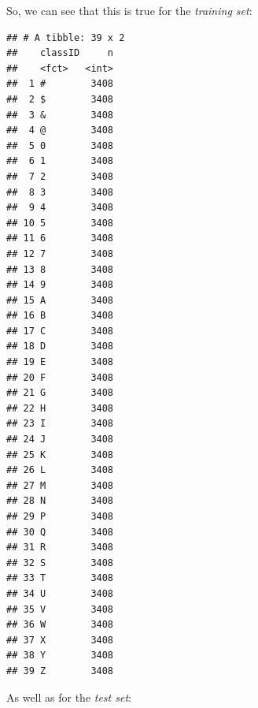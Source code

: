 \documentclass[
]{report}
\newenvironment{Shaded}{\begin{snugshade}}{\end{snugshade}}
\newcommand{\AttributeTok}[1]{\textcolor[rgb]{0.13,0.29,0.53}{#1}}
\newcommand{\FunctionTok}[1]{\textcolor[rgb]{0.13,0.29,0.53}{\textbf{#1}}}
\newcommand{\NormalTok}[1]{#1}
\newcommand{\SpecialCharTok}[1]{\textcolor[rgb]{0.81,0.36,0.00}{\textbf{#1}}}
\begin{document}
\newpage

So, we can see that this is true for the \emph{training set}:

\begin{Shaded}
\end{Shaded}

\footnotesize

\begin{verbatim}
## # A tibble: 39 x 2
##    classID     n
##    <fct>   <int>
##  1 #        3408
##  2 $        3408
##  3 &        3408
##  4 @        3408
##  5 0        3408
##  6 1        3408
##  7 2        3408
##  8 3        3408
##  9 4        3408
## 10 5        3408
## 11 6        3408
## 12 7        3408
## 13 8        3408
## 14 9        3408
## 15 A        3408
## 16 B        3408
## 17 C        3408
## 18 D        3408
## 19 E        3408
## 20 F        3408
## 21 G        3408
## 22 H        3408
## 23 I        3408
## 24 J        3408
## 25 K        3408
## 26 L        3408
## 27 M        3408
## 28 N        3408
## 29 P        3408
## 30 Q        3408
## 31 R        3408
## 32 S        3408
## 33 T        3408
## 34 U        3408
## 35 V        3408
## 36 W        3408
## 37 X        3408
## 38 Y        3408
## 39 Z        3408
\end{verbatim}

\normalsize

\newpage

As well as for the \emph{test set}:

\begin{Shaded}
\end{Shaded}

\footnotesize
\end{document}
